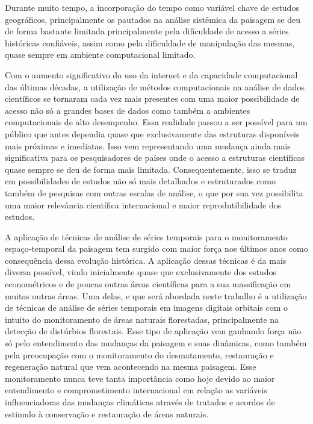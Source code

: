 \documentclass{article}
\begin{document}
Durante muito tempo, a incorporação do tempo como variável chave de estudos geográficos, principalmente os pautados na análise sistêmica da paisagem se deu de forma bastante limitada principalmente pela dificuldade de acesso a séries históricas confiáveis, assim como pela dificuldade de manipulação das mesmas, quase sempre em ambiente computacional limitado.
\par
Com o aumento significativo do uso da internet e da capacidade computacional das últimas décadas, a utilização de métodos computacionais na análise de dados científicos se tornaram cada vez mais presentes com uma maior possibilidade de acesso não só a grandes bases de dados como também a ambientes computacionais de alto desempenho. Essa realidade passou a ser possível para um público que antes dependia quase que exclusivamente das estruturas disponíveis mais próximas e imediatas. Isso vem representando uma mudança ainda mais significativa para os pesquisadores de países onde o acesso a estruturas científicas quase sempre se deu de forma mais limitada. Consequentemente, isso se traduz em possibilidades de estudos não só mais detalhados e estruturados como também de pesquisas com outras escalas de análise, o que por sua vez possibilita uma maior relevância científica internacional e maior reprodutibilidade dos estudos.
\par
A aplicação de técnicas de análise de séries temporais para o monitoramento espaço-temporal da paisagem tem surgido com maior força nos últimos anos como consequência dessa evolução histórica. A aplicação dessas técnicas é da mais diversa possível, vindo inicialmente quase que exclusivamente dos estudos econométricos e de poucas outras áreas científicas para a sua massificação em muitas outras áreas. Uma delas, e que será abordada neste trabalho é a utilização de técnicas de análise de séries temporais em imagens digitais orbitais com o intuito do monitoramento de áreas naturais florestadas, principalmente na detecção de distúrbios florestais. Esse tipo de aplicação vem ganhando força não só pelo entendimento das mudanças da paisagem e suas dinâmicas, como também pela preocupação com o monitoramento do desmatamento, restauração e regeneração natural que vem acontecendo na mesma paisagem. Esse monitoramento nunca teve tanta importância como hoje devido ao maior entendimento e comprometimento internacional em relação as variáveis influenciadoras das mudanças climáticas através de tratados e acordos de estimulo à conservação e restauração de áreas naturais. 
\par
\end{document}
